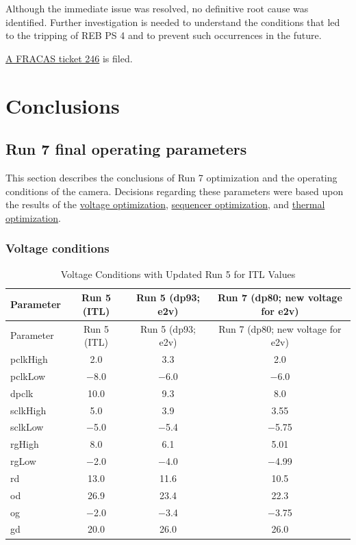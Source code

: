 Although the immediate issue was resolved, no definitive root cause was identified. Further investigation is needed to understand the conditions that led to the tripping of REB PS 4 and to prevent such occurrences in the future.

\href{https://rubinobs.atlassian.net/browse/FRACAS-246}{A FRACAS ticket 246} is filed. 

\clearpage
\section{Conclusions}\label{conclusions}

\subsection{Run 7 final operating
parameters}\label{run-7-final-operating-parameters}

This section describes the conclusions of Run 7 optimization and the
operating conditions of the camera. Decisions regarding these parameters
were based upon the results of the
\href{https://sitcomtn-148.lsst.io/\#persistence-optimization}{voltage
optimization},
\href{https://sitcomtn-148.lsst.io/\#sequencer-optimization}{sequencer
optimization}, and
\href{https://sitcomtn-148.lsst.io/\#thermal-optimization}{thermal
optimization}.


\subsubsection{Voltage conditions}\label{voltage-conditions}

\begin{longtable}{@{}l|c|cc@{}}
\caption{Voltage Conditions with Updated Run 5 for ITL Values} \\
\toprule
Parameter & Run 5 (ITL) & Run 5 (dp93; e2v) & Run 7 (dp80; new voltage for e2v) \\
\midrule
\endfirsthead
\toprule
Parameter & Run 5 (ITL) & Run 5 (dp93; e2v) & Run 7 (dp80; new voltage for e2v) \\
\midrule
\endhead
\bottomrule
\endfoot
pclkHigh & 2.0 & 3.3 & 2.0 \\
pclkLow & $-$8.0 & $-$6.0 & $-$6.0 \\
dpclk & 10.0 & 9.3 & 8.0 \\
sclkHigh & 5.0 & 3.9 & 3.55 \\
sclkLow & $-$5.0 & $-$5.4 & $-$5.75 \\
rgHigh & 8.0 & 6.1 & 5.01 \\
rgLow & $-$2.0 & $-$4.0 & $-$4.99 \\
rd & 13.0 & 11.6 & 10.5 \\
od & 26.9 & 23.4 & 22.3 \\
og & $-$2.0 & $-$3.4 & $-$3.75 \\
gd & 20.0 & 26.0 & 26.0 \\
\end{longtable}



